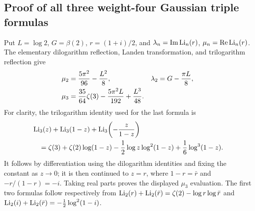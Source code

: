 \subsection{Proof of all three weight-four Gaussian triple formulas}
\label{gaussian:subsec:gaussian-triples}

Put $L=\log2$, $G=\beta(2)$, $r=(1+i)/2$, and
$\lambda_n=\operatorname{Im}\operatorname{Li}_n(r)$,
$\mu_n=\operatorname{Re}\operatorname{Li}_n(r)$. The elementary dilogarithm reflection,
Landen transformation, and trilogarithm reflection give
\begin{align}
 \mu_2&=\frac{5\pi^2}{96}-\frac{L^2}{8},&
 \lambda_2&=G-\frac{\pi L}{8},\notag\\
 \mu_3&=\frac{35}{64}\zeta(3)-\frac{5\pi^2L}{192}
                       +\frac{L^3}{48}.
 \label{gaussian:eq:halfpoint-auxiliary}
\end{align}
For clarity, the trilogarithm identity used for the last formula is
\begin{align*}
 &\operatorname{Li}_3(z)+\operatorname{Li}_3(1-z)+\operatorname{Li}_3\!\left(-\frac{z}{1-z}\right)\\
 &\quad=\zeta(3)+\zeta(2)\log(1-z)
  -\frac12\log z\log^2(1-z)+\frac16\log^3(1-z).
\end{align*}
It follows by differentiation using the dilogarithm identities and fixing
the constant as $z\to0$; it is then continued to $z=r$, where
$1-r=\bar r$ and $-r/(1-r)=-i$. Taking real parts proves the displayed
$\mu_3$ evaluation. The first two formulas follow respectively from
$\operatorname{Li}_2(r)+\operatorname{Li}_2(\bar r)=\zeta(2)-\log r\log\bar r$ and
$\operatorname{Li}_2(i)+\operatorname{Li}_2(\bar r)=-\tfrac12\log^2(1-i)$.

